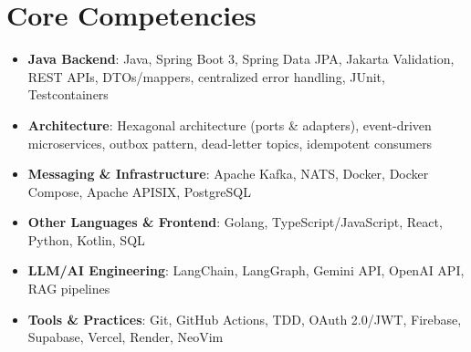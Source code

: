 \documentclass[11pt,a4paper,sans]{moderncv}
\begin{document}
\section{Core Competencies}
\vspace{1pt}
\begin{itemize}

\item \textbf{Java Backend}: Java, Spring Boot 3, Spring Data JPA, Jakarta Validation, REST APIs, DTOs/mappers, centralized error handling, JUnit, Testcontainers

\item \textbf{Architecture}: Hexagonal architecture (ports \& adapters), event-driven microservices, outbox pattern, dead-letter topics, idempotent consumers

\item \textbf{Messaging \& Infrastructure}: Apache Kafka, NATS, Docker, Docker Compose, Apache APISIX, PostgreSQL

\item \textbf{Other Languages \& Frontend}: Golang, TypeScript/JavaScript, React, Python, Kotlin, SQL

\item \textbf{LLM/AI Engineering}: LangChain, LangGraph, Gemini API, OpenAI API, RAG pipelines

\item \textbf{Tools \& Practices}: Git, GitHub Actions, TDD, OAuth 2.0/JWT, Firebase, Supabase, Vercel, Render, NeoVim

\end{itemize}

\end{document}
